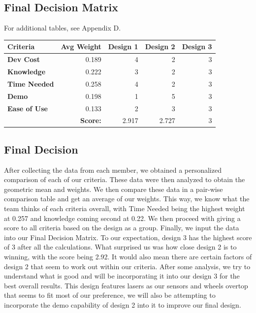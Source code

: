 \documentclass[12pt]{article}
\newcommand\cellhead[1]{\cellcolor{lightgray}\textbf{ #1 }}
\begin{document}
        \subsection{Final Decision Matrix}
            \noindent For additional tables, see Appendix D.

            \begin{center}\begin{tabular}{|l|r|r|r|r|}
                \hline
                \cellhead{Criteria} & \cellhead{Avg Weight} & \cellhead{Design 1} & \cellhead{Design 2} & \cellhead{Design 3} \\\hline
                \cellhead{Dev Cost} & 0.189 & 4 & 2 & 3 \\\hline
                \cellhead{Knowledge}& 0.222 & 3 & 2 & 3 \\\hline
                \cellhead{Time Needed} & 0.258 & 4 & 2 & 3 \\\hline
                \cellhead{Demo} & 0.198 & 1 & 5 & 3 \\\hline
                \cellhead{Ease of Use} & 0.133 & 2 & 3 & 3 \\\hline
                & \cellhead{Score:} & 2.917 & 2.727 & 3 \\\hline
            \end{tabular}\end{center}
        
        \subsection{Final Decision}
            After collecting the data from each member, we obtained a personalized comparison of each of our criteria.
            These data were then analyzed to obtain the geometric mean and weights.
            We then compare these data in a pair-wise comparison table and get an average of our weights.
            This way, we know what the team thinks of each criteria overall, with Time Needed being the highest weight at 0.257 and knowledge coming second at 0.22.
            We then proceed with giving a score to all criteria based on the design as a group.
            Finally, we input the data into our Final Decision Matrix.
            To our expectation, design 3 has the highest score of 3 after all the calculations.
            What surprised us was how close design 2 is to winning, with the score being 2.92.
            It would also mean there are certain factors of design 2 that seem to work out within our criteria.
            After some analysis, we try to understand what is good and will be incorporating it into our design 3 for the best overall results.
            This design features lasers as our sensors and wheels overtop that seems to fit most of our preference, we will also be attempting to incorporate the demo capability of design 2 into it to improve our final design.
\end{document}
